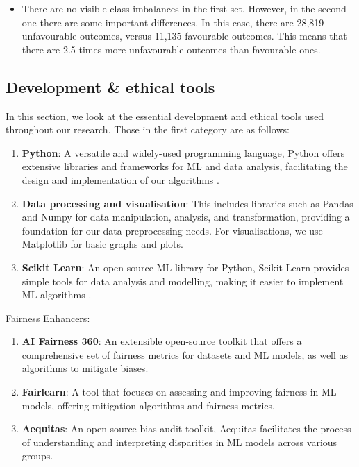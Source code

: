 \documentclass[twoside,11pt]{article}
\begin{document}
\begin{itemize}
        \item There are no visible class imbalances in the first set. However, in the second one there are some important differences. In this case, there are 28,819 unfavourable outcomes, versus 11,135 favourable outcomes. This means that there are 2.5 times more unfavourable outcomes than favourable ones.
        
    \end{itemize}

\subsection{Development \& ethical tools}

In this section, we look at the essential development and ethical tools used throughout our research. Those in the first category are as follows:

\begin{enumerate}
    \item \textbf{Python}: A versatile and widely-used programming language, Python offers extensive libraries and frameworks for ML and data analysis, facilitating the design and implementation of our algorithms .
    
    \item \textbf{Data processing and visualisation}: This includes libraries such as Pandas  and Numpy  for data manipulation, analysis, and transformation, providing a foundation for our data preprocessing needs. For visualisations, we use Matplotlib  for basic graphs and plots.

    \item \textbf{Scikit Learn}: An open-source ML library for Python, Scikit Learn provides simple tools for data analysis and modelling, making it easier to implement ML algorithms .
\end{enumerate}

Fairness Enhancers:

\begin{enumerate}
    
    \item \textbf{AI Fairness 360}: An extensible open-source toolkit that offers a comprehensive set of fairness metrics for datasets and ML models, as well as algorithms to mitigate biases.
    
    \item \textbf{Fairlearn}: A tool that focuses on assessing and improving fairness in ML models, offering mitigation algorithms and fairness metrics.

    \item \textbf{Aequitas}: An open-source bias audit toolkit, Aequitas facilitates the process of understanding and interpreting disparities in ML models across various groups.
\end{enumerate}
\end{document}

